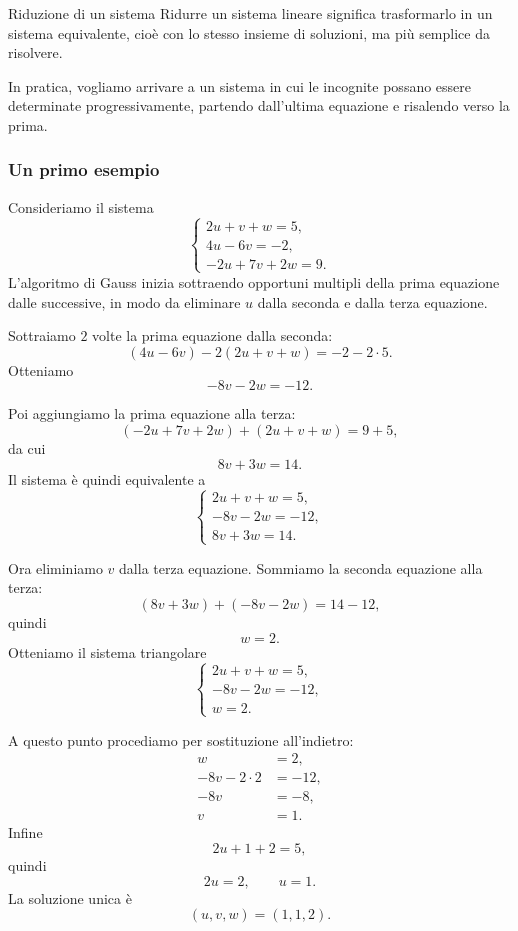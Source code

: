 \documentclass[a4paper]{article}
\begin{document}
\begin{snippetdefinition}{Riduzione di un sistema}
    Ridurre un sistema lineare significa trasformarlo in un sistema equivalente, cioè con lo stesso insieme di soluzioni, ma più semplice da risolvere.

    In pratica, vogliamo arrivare a un sistema in cui le incognite possano essere determinate progressivamente, partendo dall'ultima equazione e risalendo verso la prima.
\end{snippetdefinition}

\subsubsection{Un primo esempio}

Consideriamo il sistema
\[
    \begin{cases}
        2u+v+w=5,\\
        4u-6v=-2,\\
        -2u+7v+2w=9.
    \end{cases}
\]
L'algoritmo di Gauss inizia sottraendo opportuni multipli della prima equazione dalle successive, in modo da eliminare \(u\) dalla seconda e dalla terza equazione.

Sottraiamo \(2\) volte la prima equazione dalla seconda:
\[
    (4u-6v)-2(2u+v+w)=-2-2\cdot 5.
\]
Otteniamo
\[
    -8v-2w=-12.
\]

Poi aggiungiamo la prima equazione alla terza:
\[
    (-2u+7v+2w)+(2u+v+w)=9+5,
\]
da cui
\[
    8v+3w=14.
\]
Il sistema è quindi equivalente a
\[
    \begin{cases}
        2u+v+w=5,\\
        -8v-2w=-12,\\
        8v+3w=14.
    \end{cases}
\]

Ora eliminiamo \(v\) dalla terza equazione. Sommiamo la seconda equazione alla terza:
\[
    (8v+3w)+(-8v-2w)=14-12,
\]
quindi
\[
    w=2.
\]
Otteniamo il sistema triangolare
\[
    \begin{cases}
        2u+v+w=5,\\
        -8v-2w=-12,\\
        w=2.
    \end{cases}
\]

A questo punto procediamo per sostituzione all'indietro:
\begin{align*}
    w&=2,\\
    -8v-2\cdot 2&=-12,\\
    -8v&=-8,\\
    v&=1.
\end{align*}
Infine
\[
    2u+1+2=5,
\]
quindi
\[
    2u=2,
    \qquad
    u=1.
\]
La soluzione unica è
\[
    (u,v,w)=(1,1,2).
\]
\end{document}
